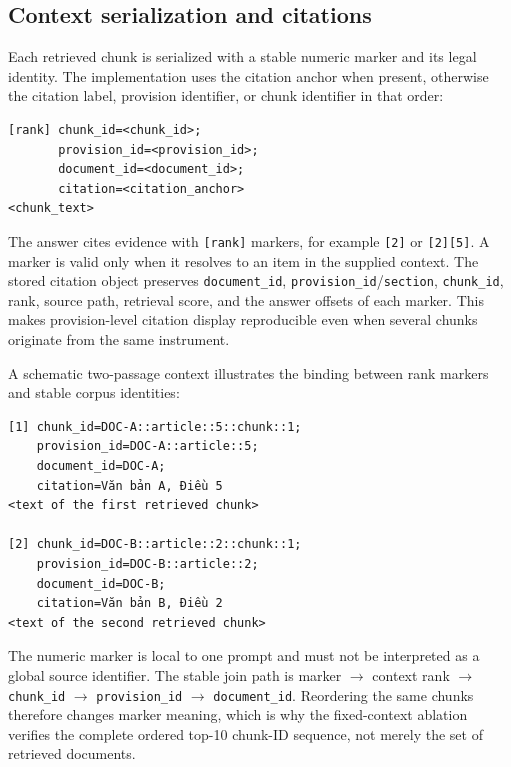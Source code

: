 \subsection{Context serialization and citations}

Each retrieved chunk is serialized with a stable numeric marker and its legal
identity. The implementation uses the citation anchor when present, otherwise
the citation label, provision identifier, or chunk identifier in that order:

{\scriptsize
\begin{verbatim}
[rank] chunk_id=<chunk_id>;
       provision_id=<provision_id>;
       document_id=<document_id>;
       citation=<citation_anchor>
<chunk_text>
\end{verbatim}
}

The answer cites evidence with \texttt{[rank]} markers, for example
\texttt{[2]} or \texttt{[2][5]}. A marker is valid only when it resolves to an
item in the supplied context. The stored citation object preserves
\texttt{document\_id}, \texttt{provision\_id}/\texttt{section},
\texttt{chunk\_id}, rank, source path, retrieval score, and the answer offsets
of each marker. This makes provision-level citation display reproducible even
when several chunks originate from the same instrument.

A schematic two-passage context illustrates the binding between rank markers
and stable corpus identities:

{\scriptsize
\begin{verbatim}
[1] chunk_id=DOC-A::article::5::chunk::1;
    provision_id=DOC-A::article::5;
    document_id=DOC-A;
    citation=Văn bản A, Điều 5
<text of the first retrieved chunk>

[2] chunk_id=DOC-B::article::2::chunk::1;
    provision_id=DOC-B::article::2;
    document_id=DOC-B;
    citation=Văn bản B, Điều 2
<text of the second retrieved chunk>
\end{verbatim}
}

The numeric marker is local to one prompt and must not be interpreted as a
global source identifier. The stable join path is marker $\rightarrow$ context
rank $\rightarrow$ \texttt{chunk\_id} $\rightarrow$
\texttt{provision\_id} $\rightarrow$ \texttt{document\_id}. Reordering the
same chunks therefore changes marker meaning, which is why the fixed-context
ablation verifies the complete ordered top-10 chunk-ID sequence, not merely
the set of retrieved documents.

